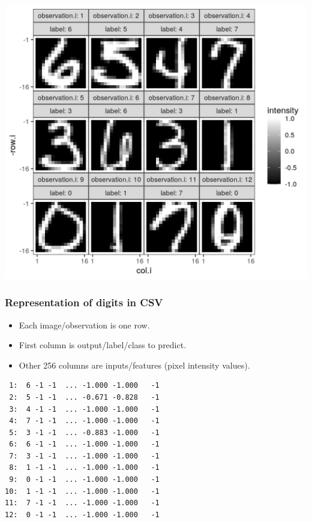 \documentclass{beamer}
\begin{document}
\begin{frame}
  \includegraphics[height=\textheight]{figure-validation-loss-digits}
\end{frame}

\begin{frame}[fragile]
  \frametitle{Representation of digits in CSV}

  \begin{itemize}
  \item Each image/observation is one row.
  \item First column is output/label/class to predict.
  \item Other 256 columns are inputs/features (pixel intensity
    values).
  \end{itemize}

\begin{verbatim}
 1:  6 -1 -1  ... -1.000 -1.000   -1
 2:  5 -1 -1  ... -0.671 -0.828   -1
 3:  4 -1 -1  ... -1.000 -1.000   -1
 4:  7 -1 -1  ... -1.000 -1.000   -1
 5:  3 -1 -1  ... -0.883 -1.000   -1
 6:  6 -1 -1  ... -1.000 -1.000   -1
 7:  3 -1 -1  ... -1.000 -1.000   -1
 8:  1 -1 -1  ... -1.000 -1.000   -1
 9:  0 -1 -1  ... -1.000 -1.000   -1
10:  1 -1 -1  ... -1.000 -1.000   -1
11:  7 -1 -1  ... -1.000 -1.000   -1
12:  0 -1 -1  ... -1.000 -1.000   -1
\end{verbatim}
  
\end{frame}
\end{document}
